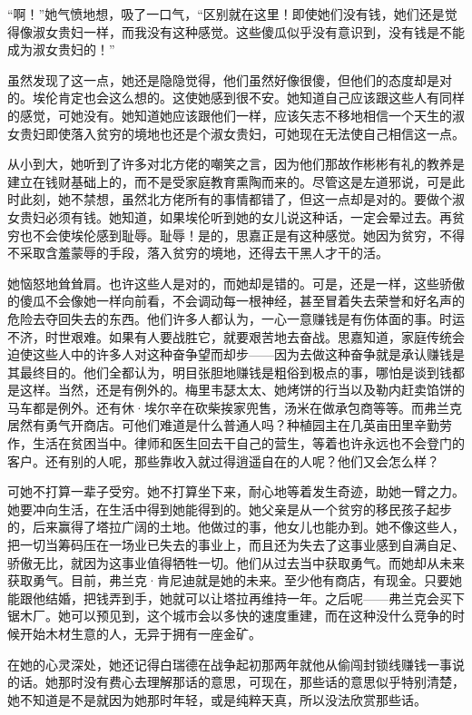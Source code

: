 \par “啊！”她气愤地想，吸了一口气，“区别就在这里！即使她们没有钱，她们还是觉得像淑女贵妇一样，而我没有这种感觉。这些傻瓜似乎没有意识到，没有钱是不能成为淑女贵妇的！”
\par 虽然发现了这一点，她还是隐隐觉得，他们虽然好像很傻，但他们的态度却是对的。埃伦肯定也会这么想的。这使她感到很不安。她知道自己应该跟这些人有同样的感觉，可她没有。她知道她应该跟他们一样，应该矢志不移地相信一个天生的淑女贵妇即使落入贫穷的境地也还是个淑女贵妇，可她现在无法使自己相信这一点。
\par 从小到大，她听到了许多对北方佬的嘲笑之言，因为他们那故作彬彬有礼的教养是建立在钱财基础上的，而不是受家庭教育熏陶而来的。尽管这是左道邪说，可是此时此刻，她不禁想，虽然北方佬所有的事情都错了，但这一点却是对的。要做个淑女贵妇必须有钱。她知道，如果埃伦听到她的女儿说这种话，一定会晕过去。再贫穷也不会使埃伦感到耻辱。耻辱！是的，思嘉正是有这种感觉。她因为贫穷，不得不采取含羞蒙辱的手段，落入贫穷的境地，还得去干黑人才干的活。
\par 她恼怒地耸耸肩。也许这些人是对的，而她却是错的。可是，还是一样，这些骄傲的傻瓜不会像她一样向前看，不会调动每一根神经，甚至冒着失去荣誉和好名声的危险去夺回失去的东西。他们许多人都认为，一心一意赚钱是有伤体面的事。时运不济，时世艰难。如果有人要战胜它，就要艰苦地去奋战。思嘉知道，家庭传统会迫使这些人中的许多人对这种奋争望而却步——因为去做这种奋争就是承认赚钱是其最终目的。他们全都认为，明目张胆地赚钱是粗俗到极点的事，哪怕是谈到钱都是这样。当然，还是有例外的。梅里韦瑟太太、她烤饼的行当以及勒内赶卖馅饼的马车都是例外。还有休·埃尔辛在砍柴挨家兜售，汤米在做承包商等等。而弗兰克居然有勇气开商店。可他们难道是什么普通人吗？种植园主在几英亩田里辛勤劳作，生活在贫困当中。律师和医生回去干自己的营生，等着也许永远也不会登门的客户。还有别的人呢，那些靠收入就过得逍遥自在的人呢？他们又会怎么样？
\par 可她不打算一辈子受穷。她不打算坐下来，耐心地等着发生奇迹，助她一臂之力。她要冲向生活，在生活中得到她能得到的。她父亲是从一个贫穷的移民孩子起步的，后来赢得了塔拉广阔的土地。他做过的事，他女儿也能办到。她不像这些人，把一切当筹码压在一场业已失去的事业上，而且还为失去了这事业感到自满自足、骄傲无比，就因为这事业值得牺牲一切。他们从过去当中获取勇气。而她却从未来获取勇气。目前，弗兰克·肯尼迪就是她的未来。至少他有商店，有现金。只要她能跟他结婚，把钱弄到手，她就可以让塔拉再维持一年。之后呢——弗兰克会买下锯木厂。她可以预见到，这个城市会以多快的速度重建，而在这种没什么竞争的时候开始木材生意的人，无异于拥有一座金矿。
\par 在她的心灵深处，她还记得白瑞德在战争起初那两年就他从偷闯封锁线赚钱一事说的话。她那时没有费心去理解那话的意思，可现在，那些话的意思似乎特别清楚，她不知道是不是就因为她那时年轻，或是纯粹天真，所以没法欣赏那些话。
